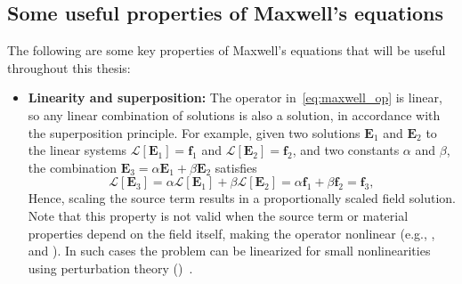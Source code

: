     \subsection*{Some useful properties of Maxwell's equations}
    The following are some key properties of Maxwell's equations that will be
    useful throughout this thesis:
    \begin{itemize}
        \item \textbf{Linearity and superposition:} The operator in~\eqref{eq:maxwell_op} is linear, so any linear combination of solutions is
              also a solution, in accordance with the superposition principle.
              For example, given two solutions $\mathbf{E}_1$ and $\mathbf{E}_2$ to the
              linear systems $\mathcal{L}[\mathbf{E}_1] = \mathbf{f}_1$ and
              $\mathcal{L}[\mathbf{E}_2] = \mathbf{f}_2$,
              and two constants $\alpha$ and $\beta$, the combination $\mathbf{E}_3 =
                  \alpha \mathbf{E}_1 + \beta \mathbf{E}_2$ satisfies
              \begin{equation}
                  \mathcal{L}[\mathbf{E}_3] = \alpha \mathcal{L}[\mathbf{E}_1] + \beta
                  \mathcal{L}[\mathbf{E}_2] = \alpha \mathbf{f}_1 + \beta \mathbf{f}_2 =
                  \mathbf{f}_3,
              \end{equation}
              Hence, scaling the source term results in a proportionally scaled field
              solution. Note that this property is not valid when the source term or material
              properties depend on the field itself, making the operator nonlinear (e.g., ,
               and ). In such
              cases the problem can be linearized for small nonlinearities
              using perturbation theory ()~\cite{ownpub4}.


\end{itemize}
